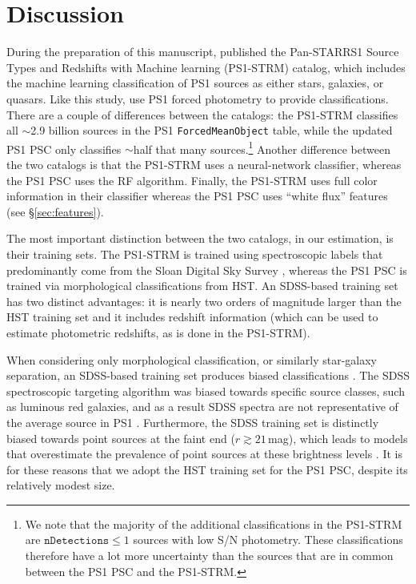 \documentclass[twocolumn]{aastex63}
\begin{document}
\section{Discussion}\label{sec:discussion}

During the preparation of this manuscript, \citet{Beck20} published the
Pan-STARRS1 Source Types and Redshifts with Machine learning (PS1-STRM)
catalog, which includes the machine learning classification of PS1 sources as
either stars, galaxies, or quasars. Like this study, \citet{Beck20} use PS1
forced photometry to provide classifications. There are a couple of
differences between the catalogs: the PS1-STRM classifies all $\sim$2.9
billion sources in the PS1 \texttt{ForcedMeanObject} table, while the updated
PS1 PSC only classifies $\sim$half that many sources.\footnote{We note that
the majority of the additional classifications in the PS1-STRM are
$\mathtt{nDetections} \le 1$ sources with low S/N photometry. These
classifications therefore have a lot more uncertainty than the sources that
are in common between the PS1 PSC and the PS1-STRM.} Another difference
between the two catalogs is that the PS1-STRM uses a neural-network
classifier, whereas the PS1 PSC uses the RF algorithm. Finally, the PS1-STRM
uses full color information in their classifier whereas the PS1 PSC uses
``white flux'' features (see \S\ref{sec:features}).

The most important distinction between the two catalogs, in our estimation, is
their training sets. The PS1-STRM is trained using spectroscopic labels that
predominantly come from the Sloan Digital Sky Survey
\citet[SDSS][]{Abolfathi18}, whereas the PS1 PSC is trained via morphological
classifications from HST. An SDSS-based training set has two distinct
advantages: it is nearly two orders of magnitude larger than the HST training
set and it includes redshift information (which can be used to estimate
photometric redshifts, as is done in the PS1-STRM).

When considering only morphological classification, or similarly star-galaxy
separation, an SDSS-based training set produces biased classifications
\citep{Tachibana18}. The SDSS spectroscopic targeting algorithm was biased
towards specific source classes, such as luminous red galaxies, and as a
result SDSS spectra are not representative of the average source in PS1
\citep[see Figure~1 in][]{Tachibana18}. Furthermore, the SDSS training set is
distinctly biased towards point sources at the faint end ($r \gtrsim
21$\,mag), which leads to models that overestimate the prevalence of point
sources at these brightness levels \citep[see e.g., Figure~7
in][]{Tachibana18}. It is for these reasons that we adopt the HST training set
for the PS1 PSC, despite its relatively modest size.
\end{document}
